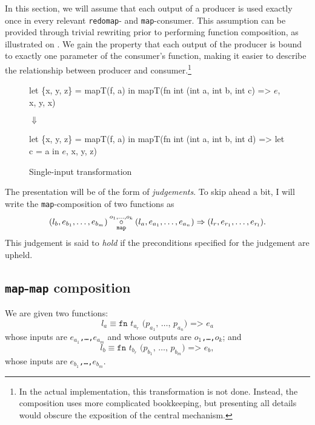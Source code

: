 In this section, we will assume that each output of a producer is used
exactly once in every relevant \texttt{redomap}- and
\texttt{map}-consumer.  This assumption can be provided through
trivial rewriting prior to performing function composition, as
illustrated on .  We gain the
property that each output of the producer is bound to exactly one
parameter of the consumer's function, making it easier to describe the
relationship between producer and consumer.\footnote{In the actual
  implementation, this transformation is not done.  Instead, the
  composition uses more complicated bookkeeping, but presenting all
  details would obscure the exposition of the central mechanism.}

\begin{figure}
\begin{center}
\begin{bcolorcode}
let \{x, y, z\} = mapT(f, a) in
mapT(fn int (int a, int b, int c) => \(e\), x, y, x)
\end{bcolorcode}

$\Downarrow$

\begin{bcolorcode}
let \{x, y, z\} = mapT(f, a) in
mapT(fn int (int a, int b, int d) =>
       let c = a in \(e\),
     x, y, z)
\end{bcolorcode}
\end{center}
\caption{Single-input transformation}
\label{fig:single-input-transform}
\end{figure}

The presentation will be of the form of \textit{judgements}.  To skip
ahead a bit, I will write the \texttt{map}-composition of two
functions as
\[
(l_{b},e_{b_{1}},\ldots,e_{b_{m}}) \underset{\texttt{map}}{\overset{o_1,\ldots,o_k}\circ}(l_{a},e_{a_{1}},\ldots,e_{a_{n}}) \Rightarrow (l_{r},e_{r_{1}},\ldots,e_{r_{l}}).
\]
This judgement is said to \textit{hold} if the preconditions specified
for the judgement are upheld.

\subsection{\texttt{map}-\texttt{map} composition}
\label{sec:map-map-composition}

We are given two functions:
\[
l_{a}\equiv\texttt{fn $t_{a_{r}}$ ($p_{a_{1}}$, \ldots, $p_{a_{n}}$) => $e_{a}$}
\]
whose inputs are \texttt{$e_{a_{1}}$,\ldots,$e_{a_{m}}$} and whose
outputs are \texttt{$o_1$,\ldots,$o_k$}; and
\[
l_{b}\equiv\texttt{fn $t_{b_{r}}$ ($p_{b_{1}}$, \ldots, $p_{b_{m}}$) => $e_{b}$},
\]
whose inputs are \texttt{$e_{b_{1}}$,\ldots,$e_{b_{m}}$}.

